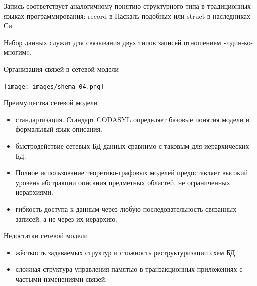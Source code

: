 \documentclass{beamer}
\begin{document}
\begin{frame}
\begin{block}{Запись}
соответствует аналогичному понятию структурного типа в традиционных языках программирования: record в Паскаль-подобных или struct в наследниках Си.
\end{block}
\begin{block}{Набор данных}
служит для связывания двух типов записей отношением «один-ко-многим».
\end{block}
\begin{block}{Организация связей в сетевой модели}
\begin{center}
\texttt{[image: images/shema-04.png]}
\end{center}
\end{block}
\end{frame}

\begin{frame}
\begin{block}{Преимущества сетевой модели}
\begin{itemize}
\item стандартизация. Стандарт CODASYL определяет базовые понятия модели и формальный язык описания.
\item быстродействие сетевых БД данных сравнимо с таковым для иерархических БД.
\item Полное использование теоретико-графовых моделей предоставляет высокий уровень абстракции описания предметных областей, не ограниченных иерархиями.
\item гибкость доступа к данным через любую последовательность связанных записей, а не через их иерархию.
\end{itemize}
\end{block}
\begin{block}{Недостатки сетевой модели}
\begin{itemize}
\item жёсткость задаваемых структур и сложность реструктуризации схем БД.
\item сложная структура управления памятью в транзакционных приложениях с частыми изменениями связей.
\end{itemize}
\end{block}
\end{frame}
\end{document}
